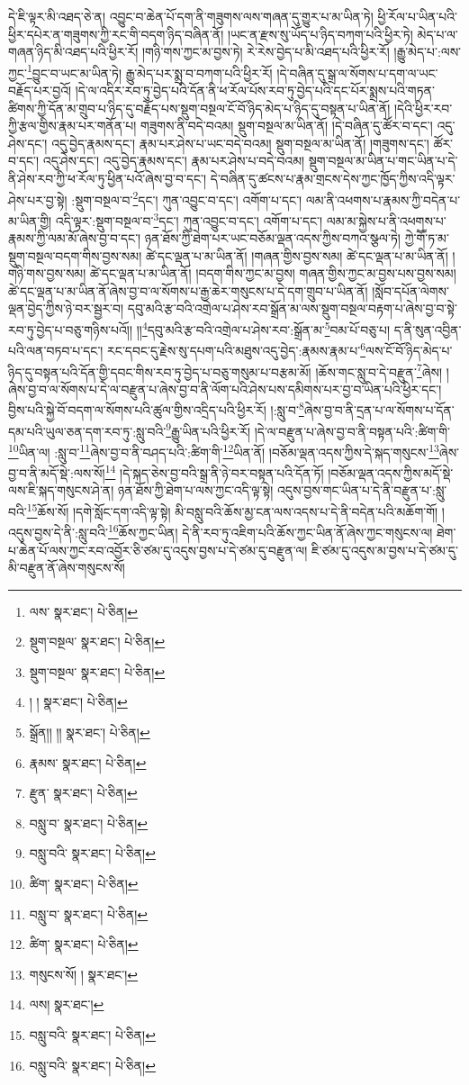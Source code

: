 དེ་ཇི་ལྟར་མི་འཐད་ཅེ་ན། འབྱུང་བ་ཆེན་པོ་དག་ནི་གཟུགས་ལས་གཞན་དུ་གྱུར་པ་མ་ཡིན་ཏེ། ཕྱི་རོལ་པ་ཡིན་པའི་ཕྱིར་དཔེར་ན་གཟུགས་ཀྱི་རང་གི་བདག་ཉིད་བཞིན་ནོ། །ཡང་ན་རྫས་སུ་ཡོད་པ་ཉིད་བཀག་པའི་ཕྱིར་ཏེ། མེད་པ་ལ་གཞན་ཉིད་མི་འཐད་པའི་ཕྱིར་རོ། །གཉི་གས་ཀྱང་མ་བྱས་ཏེ། རེ་རེས་བྱེད་པ་མི་འཐད་པའི་ཕྱིར་རོ། །རྒྱུ་མེད་པ་:ལས་ཀྱང་\footnote{ལས་  སྣར་ཐང་།  པེ་ཅིན། }བྱུང་བ་ཡང་མ་ཡིན་ཏེ། རྒྱུ་མེད་པར་སྨྲ་བ་བཀག་པའི་ཕྱིར་རོ། །དེ་བཞིན་དུ་སྒྲ་ལ་སོགས་པ་དག་ལ་ཡང་བརྗོད་པར་བྱའོ། །དེ་ལ་འདིར་རབ་ཏུ་བྱེད་པའི་དོན་ནི་ཕ་རོལ་པོས་རབ་ཏུ་བྱེད་པའི་དང་པོར་སྨྲས་པའི་གཏན་ཚིགས་ཀྱི་དོན་མ་གྲུབ་པ་ཉིད་དུ་བརྗོད་པས་སྡུག་བསྔལ་ངོ་བོ་ཉིད་མེད་པ་ཉིད་དུ་བསྟན་པ་ཡིན་ནོ། །དེའི་ཕྱིར་རབ་ཀྱི་རྩལ་གྱིས་རྣམ་པར་གནོན་པ། གཟུགས་ནི་བདེ་བའམ། སྡུག་བསྔལ་མ་ཡིན་ནོ། །དེ་བཞིན་དུ་ཚོར་བ་དང་། འདུ་ཤེས་དང་། འདུ་བྱེད་རྣམས་དང་། རྣམ་པར་ཤེས་པ་ཡང་བདེ་བའམ། སྡུག་བསྔལ་མ་ཡིན་ནོ། །གཟུགས་དང་། ཚོར་བ་དང་། འདུ་ཤེས་དང་། འདུ་བྱེད་རྣམས་དང་། རྣམ་པར་ཤེས་པ་བདེ་བའམ། སྡུག་བསྔལ་མ་ཡིན་པ་གང་ཡིན་པ་དེ་ནི་ཤེས་རབ་ཀྱི་ཕ་རོལ་ཏུ་ཕྱིན་པའོ་ཞེས་བྱ་བ་དང་། དེ་བཞིན་དུ་ཚངས་པ་རྣམ་གྲངས་དེས་ཀྱང་ཁྱོད་ཀྱིས་འདི་ལྟར་ཤེས་པར་བྱ་སྟེ། :སྡུག་བསྔལ་བ་\footnote{སྡུག་བསྔལ་  སྣར་ཐང་།  པེ་ཅིན། }དང་། ཀུན་འབྱུང་བ་དང་། འགོག་པ་དང་། ལམ་ནི་འཕགས་པ་རྣམས་ཀྱི་བདེན་པ་མ་ཡིན་གྱི། འདི་ལྟར་:སྡུག་བསྔལ་བ་\footnote{སྡུག་བསྔལ་  སྣར་ཐང་།  པེ་ཅིན། }དང་། ཀུན་འབྱུང་བ་དང་། འགོག་པ་དང་། ལམ་མ་སྐྱེས་པ་ནི་འཕགས་པ་རྣམས་ཀྱི་ལམ་མོ་ཞེས་བྱ་བ་དང་། ཉན་ཐོས་ཀྱི་ཐེག་པར་ཡང་བཅོམ་ལྡན་འདས་ཀྱིས་བཀའ་སྩལ་ཏེ། ཀྱེ་གཽ་ཏ་མ་སྡུག་བསྔལ་བདག་གིས་བྱས་སམ། ཚེ་དང་ལྡན་པ་མ་ཡིན་ནོ། །གཞན་གྱིས་བྱས་སམ། ཚེ་དང་ལྡན་པ་མ་ཡིན་ནོ། །གཉི་གས་བྱས་སམ། ཚེ་དང་ལྡན་པ་མ་ཡིན་ནོ། །བདག་གིས་ཀྱང་མ་བྱས། གཞན་གྱིས་ཀྱང་མ་བྱས་པས་བྱས་སམ། ཚེ་དང་ལྡན་པ་མ་ཡིན་ནོ་ཞེས་བྱ་བ་ལ་སོགས་པ་རྒྱ་ཆེར་གསུངས་པ་དེ་དག་གྲུབ་པ་ཡིན་ནོ། །སློབ་དཔོན་ལེགས་ལྡན་བྱེད་ཀྱིས་ཉེ་བར་སྦྱར་བ། དབུ་མའི་རྩ་བའི་འགྲེལ་པ་ཤེས་རབ་སྒྲོན་མ་ལས་སྡུག་བསྔལ་བརྟག་པ་ཞེས་བྱ་བ་སྟེ་རབ་ཏུ་བྱེད་པ་བཅུ་གཉིས་པའོ།། །།\footnote{། །  སྣར་ཐང་།  པེ་ཅིན། }དབུ་མའི་རྩ་བའི་འགྲེལ་པ་ཤེས་རབ་:སྒྲོན་མ་\footnote{སྒྲོན།། །།  སྣར་ཐང་།  པེ་ཅིན། }བམ་པོ་བཅུ་པ། ད་ནི་སུན་འབྱིན་པའི་ལན་བཏབ་པ་དང་། རང་དབང་དུ་རྗེས་སུ་དཔག་པའི་མཐུས་འདུ་བྱེད་:རྣམས་རྣམ་པ་\footnote{རྣམས་  སྣར་ཐང་།  པེ་ཅིན། }ལས་ངོ་བོ་ཉིད་མེད་པ་ཉིད་དུ་བསྟན་པའི་དོན་གྱི་དབང་གིས་རབ་ཏུ་བྱེད་པ་བཅུ་གསུམ་པ་བརྩམ་མོ། །ཆོས་གང་སླུ་བ་དེ་བརྫུན་\footnote{རྫུན་  སྣར་ཐང་།  པེ་ཅིན། }ཞེས། །ཞེས་བྱ་བ་ལ་སོགས་པ་དེ་ལ་བརྫུན་པ་ཞེས་བྱ་བ་ནི་ལོག་པའི་ཤེས་པས་དམིགས་པར་བྱ་བ་ཡིན་པའི་ཕྱིར་དང་། བྱིས་པའི་སྐྱེ་བོ་བདག་ལ་སོགས་པའི་ཚུལ་གྱིས་འདྲིད་པའི་ཕྱིར་རོ། །:སླུ་བ་\footnote{བསླུ་བ་  སྣར་ཐང་།  པེ་ཅིན། }ཞེས་བྱ་བ་ནི་དྲན་པ་ལ་སོགས་པ་དོན་དམ་པའི་ཡུལ་ཅན་དག་རབ་ཏུ་:སླུ་བའི་\footnote{བསླུ་བའི་  སྣར་ཐང་།  པེ་ཅིན། }རྒྱུ་ཡིན་པའི་ཕྱིར་རོ། །དེ་ལ་བརྫུན་པ་ཞེས་བྱ་བ་ནི་བསྟན་པའི་:ཚིག་གི་\footnote{ཚིག་  སྣར་ཐང་།  པེ་ཅིན། }ཡིན་ལ། :སླུ་བ་\footnote{བསླུ་བ་  སྣར་ཐང་།  པེ་ཅིན། }ཞེས་བྱ་བ་ནི་བཤད་པའི་:ཚིག་གི་\footnote{ཚིག་  སྣར་ཐང་།  པེ་ཅིན། }ཡིན་ནོ། །བཅོམ་ལྡན་འདས་ཀྱིས་དེ་སྐད་གསུངས་\footnote{གསུངས་སོ། །  སྣར་ཐང་། }ཞེས་བྱ་བ་ནི་མདོ་སྡེ་:ལས་སོ།\footnote{ལས།  སྣར་ཐང་། } །དེ་སྐད་ཅེས་བྱ་བའི་སྒྲ་ནི་ཉེ་བར་བསྟན་པའི་དོན་ཏོ། །བཅོམ་ལྡན་འདས་ཀྱིས་མདོ་སྡེ་ལས་ཇི་སྐད་གསུངས་ཤེ་ན། ཉན་ཐོས་ཀྱི་ཐེག་པ་ལས་ཀྱང་འདི་ལྟ་སྟེ། འདུས་བྱས་གང་ཡིན་པ་དེ་ནི་བརྫུན་པ་:སླུ་བའི་\footnote{བསླུ་བའི་  སྣར་ཐང་།  པེ་ཅིན། }ཆོས་སོ། །དགེ་སློང་དག་འདི་ལྟ་སྟེ། མི་བསླུ་བའི་ཆོས་མྱ་ངན་ལས་འདས་པ་དེ་ནི་བདེན་པའི་མཆོག་གོ། །འདུས་བྱས་དེ་ནི་:སླུ་བའི་\footnote{བསླུ་བའི་  སྣར་ཐང་།  པེ་ཅིན། }ཆོས་ཀྱང་ཡིན། དེ་ནི་རབ་ཏུ་འཇིག་པའི་ཆོས་ཀྱང་ཡིན་ནོ་ཞེས་ཀྱང་གསུངས་ལ། ཐེག་པ་ཆེན་པོ་ལས་ཀྱང་རབ་འབྱོར་ཅི་ཙམ་དུ་འདུས་བྱས་པ་དེ་ཙམ་དུ་བརྫུན་ལ། ཇི་ཙམ་དུ་འདུས་མ་བྱས་པ་དེ་ཙམ་དུ་མི་བརྫུན་ནོ་ཞེས་གསུངས་སོ། 